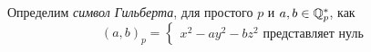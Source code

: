	  \begin{definition} 
	  	Определим \emph{символ Гильберта}, для простого $p$ и $a, b \in \mathbb{Q}_{p}^{*}$, как 
	  	\[
	  		(a, b)_{p} = \begin{cases} x^2 - ay^2 - bz^2 \text{ представляет нуль }\end{cases}
	  	\]
	  \end{definition}


	 




